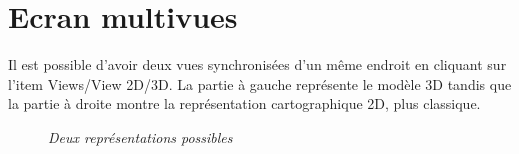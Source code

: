 \section{Ecran multivues}
Il est possible d'avoir deux vues synchronisées d'un même endroit en cliquant sur l'item {\sc Views/View 2D/3D}.
La partie à gauche représente le modèle 3D tandis que la partie à droite montre la représentation cartographique 2D, plus classique.
\begin{center}
\begin{figure}[ht]
\caption{\label{graticule}\textit{Deux représentations possibles}}
\end{figure}
\end{center}

